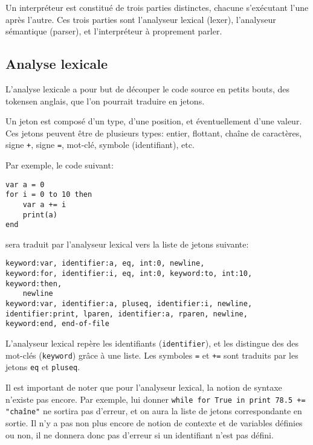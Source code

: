 \documentclass{article}
\begin{document}
Un interpréteur est constitué de trois parties distinctes, chacune s’exécutant l’une après l’autre.
Ces trois parties sont l’analyseur lexical (lexer), l’analyseur sémantique (parser), et l’interpréteur
à proprement parler.

\subsection{Analyse lexicale}
L’analyse lexicale a pour but de découper le code source en petits bouts, des 
\guillemetleft\nobreakspace tokens\nobreakspace\guillemetright\nobreakspace en anglais,
que l’on pourrait traduire en
\guillemetleft\nobreakspace jetons\nobreakspace\guillemetright\nobreakspace.

Un jeton est composé d’un type, d’une position, et éventuellement d’une valeur.
Ces jetons peuvent être de plusieurs types\nobreakspace: entier, flottant, chaîne de caractères,
signe \verb|+|, signe \verb|=|, mot-clé, symbole (identifiant), etc.

Par exemple, le code suivant\nobreakspace:

\begin{lstlisting}
var a = 0
for i = 0 to 10 then
    var a += i
    print(a)
end
\end{lstlisting}

sera traduit par l’analyseur lexical vers la liste de jetons suivante\nobreakspace:

\begin{lstlisting}
keyword:var, identifier:a, eq, int:0, newline,
keyword:for, identifier:i, eq, int:0, keyword:to, int:10, keyword:then,
    newline
keyword:var, identifier:a, pluseq, identifier:i, newline,
identifier:print, lparen, identifier:a, rparen, newline,
keyword:end, end-of-file
\end{lstlisting}

L’analyseur lexical repère les identifiants (\verb|identifier|), et les distingue des
des mot-clés (\verb|keyword|) grâce à une liste. Les symboles \verb|=| et \verb|+=| sont
traduits par les jetons \verb|eq| et \verb|pluseq|.

Il est important de noter que pour l’analyseur lexical, la notion de syntaxe n’existe pas encore.
Par exemple, lui donner \verb|while for True in print 78.5 += "chaîne"| ne sortira pas d’erreur,
et on aura la liste de jetons correspondante en sortie. Il n’y a pas non plus encore de notion de
contexte et de variables définies ou non, il ne donnera donc pas d’erreur si un identifiant n’est
pas défini.
\end{document}

